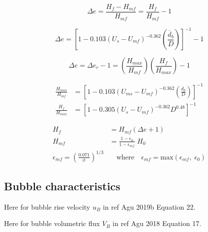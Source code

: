 \documentclass[12pt]{article}
\begin{document}
\begin{equation} \label{eq:delta-e}
    \Delta e = \frac{H_f - H_{mf}}{H_{mf}} = \frac{H_f}{H_{mf}} - 1
\end{equation}

\begin{equation} \label{eq:delta-e-bub}
    \Delta e = \left[ 1 - 0.103 (U_s - U_{mf})^{-0.362} \left( \frac{\overline{d}_b}{D} \right) \right]^{-1} - 1
\end{equation}

\begin{equation} \label{eq:delta-er}
    \Delta e = \Delta e_r - 1 = \left(\frac{H_{max}}{H_{mf}}\right) \left(\frac{H_f}{H_{max}}\right) - 1
\end{equation}

\begin{align}
    \frac{H_{max}}{H_{mf}} &= \left[1 - 0.103 (U_{ms} - U_{mf})^{-0.362} \left( \frac{\overline{d}_b}{D} \right) \right]^{-1} \label{eq:h-ratio-1} \\
    \frac{H_{f}}{H_{max}} &= \left[1 - 0.305 (U_s - U_{mf})^{-0.362} D^{0.48} \right]^{-1} \label{eq:h-ratio-2}
\end{align}

\begin{align}
    H_f &= H_{mf} (\Delta e + 1) \label{eq:Hf} \\
    H_{mf} &= \frac{1 - \epsilon_0}{1 - \epsilon_{mf}} \; H_0 \label{eq:Hmf} \\
    \epsilon_{mf} = \left(\frac{0.071}{\phi}\right)^{1/3} &\quad \text{where} \quad \epsilon_{mf} = \text{max}(\epsilon_{mf},\; \epsilon_0) \label{eq:emf}
\end{align}

\subsection{Bubble characteristics}

Here for bubble rise velocity $u_B$ in ref Agu 2019b Equation 22.

Here for bubble volumetric flux $V_B$ in ref Agu 2018 Equation 17.


\printnomenclature


\printbibliography
\end{document}
